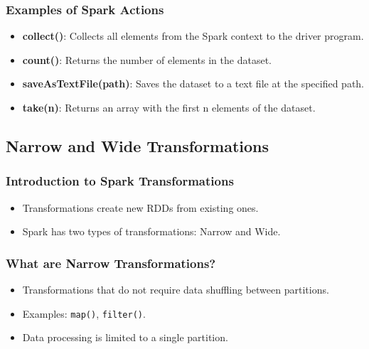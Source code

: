 \begin{frame}
  \frametitle{Examples of Spark Actions}
  \begin{itemize}
    \item \textbf{collect()}: Collects all elements from the Spark context to the driver program.
    \item \textbf{count()}: Returns the number of elements in the dataset.
    \item \textbf{saveAsTextFile(path)}: Saves the dataset to a text file at the specified path.
    \item \textbf{take(n)}: Returns an array with the first n elements of the dataset.
  \end{itemize}
\end{frame}

\subsection{Narrow and Wide Transformations}\label{subsec:narrow-and-wide-transformations}
\begin{frame}
\frametitle{Introduction to Spark Transformations}
\begin{itemize}
    \item Transformations create new RDDs from existing ones.
    \item Spark has two types of transformations: Narrow and Wide.
\end{itemize}
\end{frame}

\begin{frame}
\frametitle{What are Narrow Transformations?}
\begin{itemize}
    \item Transformations that do not require data shuffling between partitions.
    \item Examples: \texttt{map()}, \texttt{filter()}.
    \item Data processing is limited to a single partition.
\end{itemize}
\end{frame}

